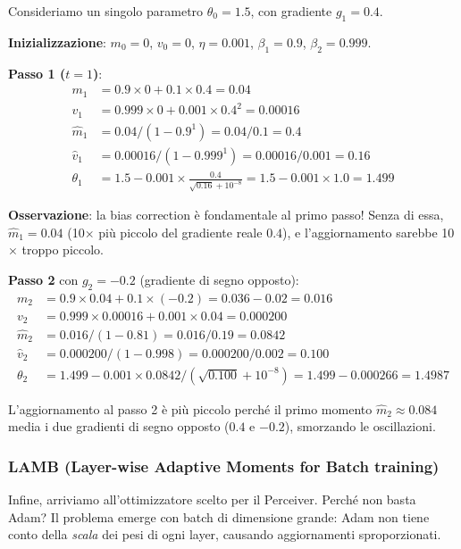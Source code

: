 \documentclass[12pt,a4paper]{article}
\begin{document}
\begin{examplebox}
Consideriamo un singolo parametro $\theta_0 = 1.5$, con gradiente $g_1 = 0.4$.

\textbf{Inizializzazione}: $m_0 = 0$, $v_0 = 0$, $\eta = 0.001$, $\beta_1 = 0.9$, $\beta_2 = 0.999$.

\textbf{Passo 1 ($t = 1$)}:
\begin{align*}
    m_1 &= 0.9 \times 0 + 0.1 \times 0.4 = 0.04 \\
    v_1 &= 0.999 \times 0 + 0.001 \times 0.4^2 = 0.00016 \\
    \hat{m}_1 &= 0.04 / (1 - 0.9^1) = 0.04 / 0.1 = 0.4 \\
    \hat{v}_1 &= 0.00016 / (1 - 0.999^1) = 0.00016 / 0.001 = 0.16 \\
    \theta_1 &= 1.5 - 0.001 \times \frac{0.4}{\sqrt{0.16} + 10^{-8}} = 1.5 - 0.001 \times 1.0 = 1.499
\end{align*}

\textbf{Osservazione}: la bias correction \`e fondamentale al primo passo! Senza di essa, $\hat{m}_1 = 0.04$ (10$\times$ pi\`u piccolo del gradiente reale $0.4$), e l'aggiornamento sarebbe 10$\times$ troppo piccolo.

\textbf{Passo 2} con $g_2 = -0.2$ (gradiente di segno opposto):
\begin{align*}
    m_2 &= 0.9 \times 0.04 + 0.1 \times (-0.2) = 0.036 - 0.02 = 0.016 \\
    v_2 &= 0.999 \times 0.00016 + 0.001 \times 0.04 = 0.000200 \\
    \hat{m}_2 &= 0.016 / (1 - 0.81) = 0.016 / 0.19 = 0.0842 \\
    \hat{v}_2 &= 0.000200 / (1 - 0.998) = 0.000200 / 0.002 = 0.100 \\
    \theta_2 &= 1.499 - 0.001 \times 0.0842 / (\sqrt{0.100} + 10^{-8}) = 1.499 - 0.000266 = 1.4987
\end{align*}

L'aggiornamento al passo 2 \`e pi\`u piccolo perch\'e il primo momento $\hat{m}_2 \approx 0.084$ media i due gradienti di segno opposto ($0.4$ e $-0.2$), smorzando le oscillazioni.
\end{examplebox}

\subsubsection{LAMB (Layer-wise Adaptive Moments for Batch training)}

Infine, arriviamo all'ottimizzatore scelto per il Perceiver. Perch\'e non basta Adam? Il problema emerge con batch di dimensione grande: Adam non tiene conto della \emph{scala} dei pesi di ogni layer, causando aggiornamenti sproporzionati.
\end{document}
